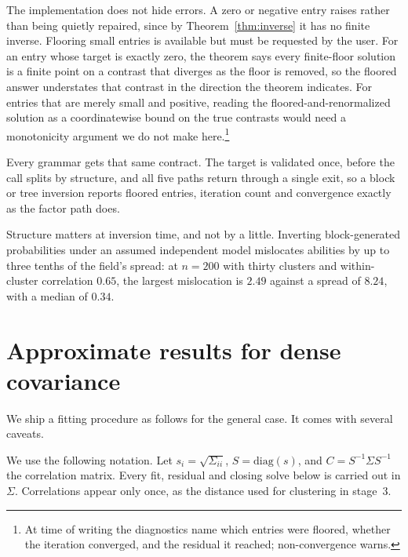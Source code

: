 \documentclass[11pt]{article}
\begin{document}
The implementation does not hide errors. A zero or negative entry raises
rather than being quietly repaired, since by Theorem~\ref{thm:inverse} it
has no finite inverse. Flooring small entries is available but must be
requested by the user. For an entry whose target is exactly zero, the
theorem says every finite-floor solution is a finite point on a contrast
that diverges as the floor is removed, so the floored answer understates
that contrast in the direction the theorem indicates. For entries that
are merely small and positive, reading the floored-and-renormalized
solution as a coordinatewise bound on the true contrasts would need a
monotonicity argument we do not make here.\footnote{At time of writing
the diagnostics name which entries were floored, whether the iteration
converged, and the residual it reached; non-convergence warns.}

Every grammar gets that same contract. The target is validated once,
before the call splits by structure, and all five paths return through a
single exit, so a block or tree inversion reports floored entries,
iteration count and convergence exactly as the factor path does.

Structure matters at inversion time, and not by a little. Inverting
block-generated probabilities under an assumed independent model
mislocates abilities by up to three tenths of the field's spread: at
$n=200$ with thirty clusters and within-cluster correlation $0.65$, the
largest mislocation is $2.49$ against a spread of $8.24$, with a median
of $0.34$.

\section{Approximate results for dense covariance}\label{sec:general}

We ship a fitting procedure as follows for the general case. It comes with several caveats.

We use the following notation. Let $s_i=\sqrt{\Sigma_{ii}}$,
$S=\mathrm{diag}(s)$, and $C=S^{-1}\Sigma S^{-1}$ the correlation
matrix. Every fit, residual and closing solve below is carried out in
$\Sigma$. Correlations appear only once, as the distance used for
clustering in stage~3.
\end{document}
